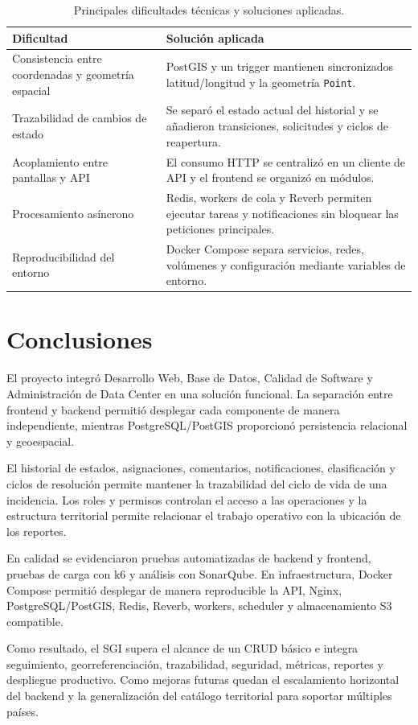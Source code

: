 \documentclass[12pt,a4paper]{article}
\begin{document}
\begin{table}[H]
\centering
\small
\begin{tabularx}{\textwidth}{@{}p{} X@{}}
\toprule
\textbf{Dificultad} & \textbf{Solución aplicada} \\
\midrule
Consistencia entre coordenadas y geometría espacial & PostGIS y un trigger mantienen sincronizados latitud/longitud y la geometría \texttt{Point}. \\
Trazabilidad de cambios de estado & Se separó el estado actual del historial y se añadieron transiciones, solicitudes y ciclos de reapertura. \\
Acoplamiento entre pantallas y API & El consumo HTTP se centralizó en un cliente de API y el frontend se organizó en módulos. \\
Procesamiento asíncrono & Redis, workers de cola y Reverb permiten ejecutar tareas y notificaciones sin bloquear las peticiones principales. \\
Reproducibilidad del entorno & Docker Compose separa servicios, redes, volúmenes y configuración mediante variables de entorno. \\
\bottomrule
\end{tabularx}
\caption{Principales dificultades técnicas y soluciones aplicadas.}
\end{table}

\section{Conclusiones}

El proyecto integró Desarrollo Web, Base de Datos, Calidad de Software y Administración de Data Center en una solución funcional. La separación entre frontend y backend permitió desplegar cada componente de manera independiente, mientras PostgreSQL/PostGIS proporcionó persistencia relacional y geoespacial.

El historial de estados, asignaciones, comentarios, notificaciones, clasificación y ciclos de resolución permite mantener la trazabilidad del ciclo de vida de una incidencia. Los roles y permisos controlan el acceso a las operaciones y la estructura territorial permite relacionar el trabajo operativo con la ubicación de los reportes.

En calidad se evidenciaron pruebas automatizadas de backend y frontend, pruebas de carga con k6 y análisis con SonarQube. En infraestructura, Docker Compose permitió desplegar de manera reproducible la API, Nginx, PostgreSQL/PostGIS, Redis, Reverb, workers, scheduler y almacenamiento S3 compatible.

Como resultado, el SGI supera el alcance de un CRUD básico e integra seguimiento, georreferenciación, trazabilidad, seguridad, métricas, reportes y despliegue productivo. Como mejoras futuras quedan el escalamiento horizontal del backend y la generalización del catálogo territorial para soportar múltiples países.


\end{document}
